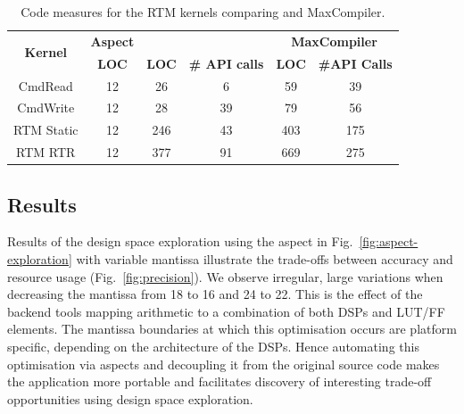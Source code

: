 \begin{table}[!h]
  \renewcommand{\arraystretch}{1.3}
  \centering
  \caption{Code measures for the RTM kernels comparing \MAXC{} and
    MaxCompiler.}
  \label{table:loc}
  \begin{tabular}{c|ccc|cc}
    \hline
    \multirow{2}{*}{\bf{Kernel}} & \bf{Aspect } & \multicolumn{2}{c|}{\bf{\MAXC{}}} & \multicolumn{2}{c}{\bf{MaxCompiler}}                   \\
    \                            & \bf{LOC}     & \bf{LOC}                       & \bf{\# API calls} & \bf{LOC} & \bf{\#API Calls} \\
    \hline \hline
    CmdRead                      & 12           & 26                             &      6         & 59       &      39        \\
    CmdWrite                     & 12           & 28                             &      39        & 79      &       56         \\
    RTM Static                   & 12           & 246                            &     43         & 403     &       175        \\
    RTM RTR                      & 12           & 377                            &     91         & 669     &       275       \\
  \end{tabular}
  \vspace{-3mm}
\end{table}

\subsection{Results}

Results of the design space exploration using the aspect in
Fig.~\ref{fig:aspect-exploration} with variable mantissa illustrate
the trade-offs between accuracy and resource usage
(Fig.~\ref{fig:precision}). We observe irregular, large variations
when decreasing the mantissa from 18 to 16 and 24 to 22. This is the
effect of the backend tools mapping arithmetic to a combination of
both DSPs and LUT/FF elements. The mantissa boundaries at which this
optimisation occurs are platform specific, depending on the
architecture of the DSPs. Hence automating this optimisation via
aspects and decoupling it from the original source code makes the
application more portable and facilitates discovery of interesting
trade-off opportunities using design space exploration.

